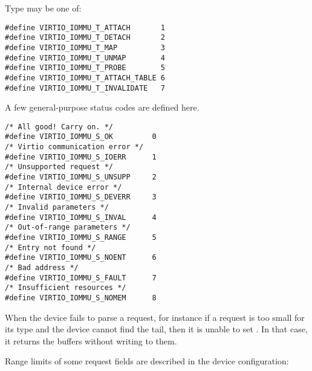 Type may be one of:

\begin{lstlisting}
#define VIRTIO_IOMMU_T_ATTACH       1
#define VIRTIO_IOMMU_T_DETACH       2
#define VIRTIO_IOMMU_T_MAP          3
#define VIRTIO_IOMMU_T_UNMAP        4
#define VIRTIO_IOMMU_T_PROBE        5
#define VIRTIO_IOMMU_T_ATTACH_TABLE 6
#define VIRTIO_IOMMU_T_INVALIDATE   7
\end{lstlisting}

A few general-purpose status codes are defined here.

\begin{lstlisting}
/* All good! Carry on. */
#define VIRTIO_IOMMU_S_OK         0
/* Virtio communication error */
#define VIRTIO_IOMMU_S_IOERR      1
/* Unsupported request */
#define VIRTIO_IOMMU_S_UNSUPP     2
/* Internal device error */
#define VIRTIO_IOMMU_S_DEVERR     3
/* Invalid parameters */
#define VIRTIO_IOMMU_S_INVAL      4
/* Out-of-range parameters */
#define VIRTIO_IOMMU_S_RANGE      5
/* Entry not found */
#define VIRTIO_IOMMU_S_NOENT      6
/* Bad address */
#define VIRTIO_IOMMU_S_FAULT      7
/* Insufficient resources */
#define VIRTIO_IOMMU_S_NOMEM      8
\end{lstlisting}

When the device fails to parse a request, for instance if a request is too
small for its type and the device cannot find the tail, then it is unable
to set . In that case, it returns the buffers without
writing to them.

Range limits of some request fields are described in the device
configuration:

